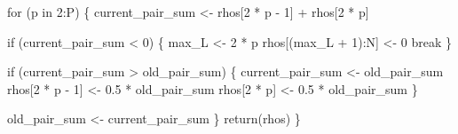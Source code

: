 \documentclass[
  letterpaper,
  DIV=11,
  numbers=noendperiod]{scrartcl}
\newenvironment{Shaded}{\begin{snugshade}}{\end{snugshade}}
\newcommand{\ControlFlowTok}[1]{\textcolor[rgb]{0.00,0.23,0.31}{#1}}
\newcommand{\DecValTok}[1]{\textcolor[rgb]{0.68,0.00,0.00}{#1}}
\newcommand{\FloatTok}[1]{\textcolor[rgb]{0.68,0.00,0.00}{#1}}
\newcommand{\FunctionTok}[1]{\textcolor[rgb]{0.28,0.35,0.67}{#1}}
\newcommand{\NormalTok}[1]{\textcolor[rgb]{0.00,0.23,0.31}{#1}}
\newcommand{\OtherTok}[1]{\textcolor[rgb]{0.00,0.23,0.31}{#1}}
\newcommand{\SpecialCharTok}[1]{\textcolor[rgb]{0.37,0.37,0.37}{#1}}
\begin{document}
\begin{Shaded}
\begin{Highlighting}[]
  \ControlFlowTok{for}\NormalTok{ (p }\ControlFlowTok{in} \DecValTok{2}\SpecialCharTok{:}\NormalTok{P) \{}
\NormalTok{    current\_pair\_sum }\OtherTok{\textless{}{-}}\NormalTok{ rhos[}\DecValTok{2} \SpecialCharTok{*}\NormalTok{ p }\SpecialCharTok{{-}} \DecValTok{1}\NormalTok{] }\SpecialCharTok{+}\NormalTok{ rhos[}\DecValTok{2} \SpecialCharTok{*}\NormalTok{ p]}
  
    \ControlFlowTok{if}\NormalTok{ (current\_pair\_sum }\SpecialCharTok{\textless{}} \DecValTok{0}\NormalTok{) \{}
\NormalTok{      max\_L }\OtherTok{\textless{}{-}} \DecValTok{2} \SpecialCharTok{*}\NormalTok{ p}
\NormalTok{      rhos[(max\_L }\SpecialCharTok{+} \DecValTok{1}\NormalTok{)}\SpecialCharTok{:}\NormalTok{N] }\OtherTok{\textless{}{-}} \DecValTok{0}
      \ControlFlowTok{break}
\NormalTok{    \}}
  
    \ControlFlowTok{if}\NormalTok{ (current\_pair\_sum }\SpecialCharTok{\textgreater{}}\NormalTok{ old\_pair\_sum) \{}
\NormalTok{      current\_pair\_sum }\OtherTok{\textless{}{-}}\NormalTok{ old\_pair\_sum}
\NormalTok{      rhos[}\DecValTok{2} \SpecialCharTok{*}\NormalTok{ p }\SpecialCharTok{{-}} \DecValTok{1}\NormalTok{] }\OtherTok{\textless{}{-}} \FloatTok{0.5} \SpecialCharTok{*}\NormalTok{ old\_pair\_sum}
\NormalTok{      rhos[}\DecValTok{2} \SpecialCharTok{*}\NormalTok{ p] }\OtherTok{\textless{}{-}} \FloatTok{0.5} \SpecialCharTok{*}\NormalTok{ old\_pair\_sum}
\NormalTok{    \}}
  
\NormalTok{    old\_pair\_sum }\OtherTok{\textless{}{-}}\NormalTok{ current\_pair\_sum}
\NormalTok{  \}}
  \FunctionTok{return}\NormalTok{(rhos)}
\NormalTok{\}}
\end{Highlighting}
\end{Shaded}
\end{document}
